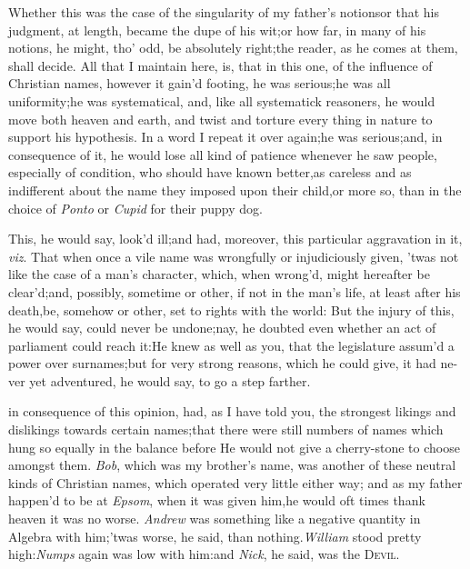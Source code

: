 \documentclass{article}
\begin{document}
Whether this was the case of the singularity of my
father’s notions\tsk  or that his judgment, at length,
became the dupe of his wit;\tsk  or how far, in many of his
notions, he might, tho’ odd, be absolutely right;\tsk  the
reader, as he comes at them, shall decide. All that I maintain
here, is, that in this one, of the influence of Christian names,
however it gain’d footing, he was serious;\tsk  he was all
uniformity;\tsk  he was systema\-tical, and, like all systematick
reasoners, he would move both heaven and earth, and twist and
torture every thing in nature to support his hypothesis. In a word
I repeat it over again;\tsk  he was
serious;\tsk  and, in consequence of it, he would lose all kind of
patience whenever he saw people, especially of condition, who
should have known better,\tsh  as careless and as
indifferent about the name they imposed upon their child,\tsk  or
more so, than in the choice of \textit{Ponto} or \textit{Cupid} for
their puppy dog.

This, he would say, look’d ill;\tsk  and had, moreover,
this particular aggravation in it, \textit{viz}. That when once a vile name
was wrongfully or injudiciously given, ’twas not like the
case of a man’s character, which, when wrong’d, might
hereafter be clear’d;\tsh  and, possibly, sometime or
other, if not in the man’s life, at least after his
death,\tsk  be, somehow or other, set to rights with the world:\break
But the injury of this, he would say, could never be
undone;\tsk  nay, he doubt\-ed even whether an act of parliament
could reach it:\tsh  He knew as well as you, that the
legislature assum’d a power over surnames;\tsk  but for very
strong reasons, which he could give, it had ne- ver yet adventured, he would say, to go a step
farther.

\noindent
{} in consequence of
this opinion, had, as I have told you, the strongest likings and
dislikings towards certain names;\tsk  that there were still
numbers of names which hung so equally in the balance before
He would not give a cherry-stone to\break
choose amongst them. \textit{Bob}, which was\break
my brother’s name, was another of these neutral kinds of
Christian names, which operated very little either way; and as my
father happen’d to be at \textit{Epsom}, when it was given him,\tsk  he would
oft times thank heaven it was no worse. \textit{Andrew} was something
like a negative quantity in Algebra with him;\tsk  ’twas
worse, he said, than nothing.\tsk  \textit{William} stood pretty
high:\tsh  \textit{Numps} again was low with him:\tsk  and
\textit{Nick}, he said, was the \textsc{Devil}.
\end{document}
